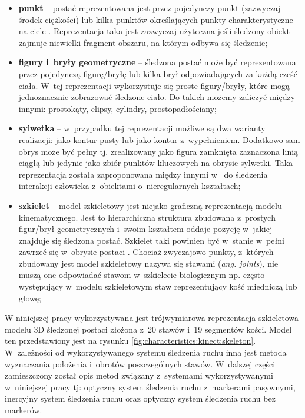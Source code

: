 \begin{itemize}
	\item \textbf{punkt} -- postać reprezentowana jest przez pojedynczy punkt (zazwyczaj środek ciężkości) \cite{Veenman2001} lub kilka punktów określających punkty charakterystyczne na ciele \cite{Serby2004}. Reprezentacja taka jest zazwyczaj użyteczna jeśli śledzony obiekt zajmuje niewielki fragment obszaru, na którym odbywa się śledzenie;
	\item \textbf{figury i~bryły geometryczne} -- śledzona postać może być reprezentowana przez pojedynczą figurę/bryłę \cite{Comaniciu2003} lub kilka brył odpowiadających za każdą cześć ciała. W~tej reprezentacji wykorzystuje się proste figury/bryły, które mogą jednoznacznie zobrazować śledzone ciało. Do takich możemy zaliczyć między innymi: prostokąty, elipsy, cylindry, prostopadłościany;
	\item \textbf{sylwetka} -- w~przypadku tej reprezentacji możliwe są dwa warianty realizacji: jako kontur pusty lub jako kontur z~wypełnieniem. Dodatkowo sam obrys może być pełny tj. zrealizowany jako figura zamknięta zaznaczona linią ciągłą lub jedynie jako zbiór punktów kluczowych na obrysie sylwetki. Taka reprezentacja została zaproponowana między innymi w~\cite{Yilmaz2004} do śledzenia interakcji człowieka z~obiektami o~nieregularnych kształtach;
	\item \textbf{szkielet} -- model szkieletowy jest niejako graficzną reprezentacją modelu kinematycznego. Jest to hierarchiczna struktura zbudowana z~prostych figur/brył geometrycznych i~swoim kształtem oddaje pozycję w~jakiej znajduje się śledzona postać. Szkielet taki powinien być w~stanie w~pełni zawrzeć się w~obrysie postaci \cite{Ali2001}. Chociaż zwyczajowo punkty, z~których zbudowany jest model szkieletowy nazywa się stawami (\emph{ang. joints}), nie muszą one odpowiadać stawom w~szkielecie biologicznym np. często występujący w~modelu szkieletowym staw reprezentujący kość miedniczą lub głowę;
\end{itemize}

W niniejszej pracy wykorzystywana jest trójwymiarowa reprezentacja szkieletowa modelu 3D śledzonej postaci złożona z~20 stawów i~19 segmentów kości. Model ten przedstawiony jest na rysunku \ref{fig:characteristics:kinect:skeleton}. W~zależności od wykorzystywanego systemu śledzenia ruchu inna jest metoda wyznaczania położenia i~obrotów poszczególnych stawów. W~dalszej części zamieszczony został opis metod związany z~systemami wykorzystywanymi w~niniejszej pracy tj: optyczny system śledzenia ruchu z~markerami pasywnymi, inercyjny system śledzenia ruchu oraz optyczny system śledzenia ruchu bez markerów.
		
